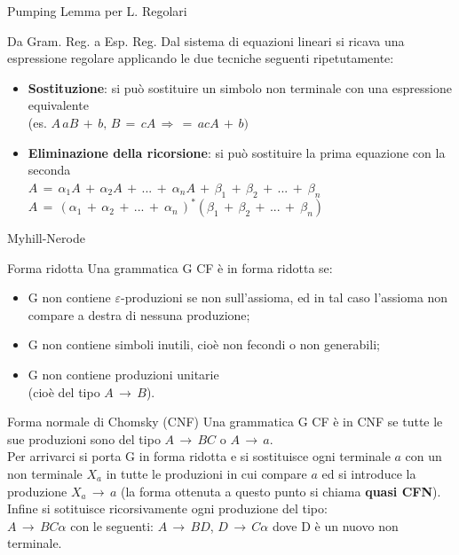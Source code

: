 \documentclass[10pt,a4paper]{article}
\begin{document}
\begin{multicols}{3}
\begin{textbox}{Pumping Lemma per L. Regolari}
\end{textbox}

\begin{textbox}{Da Gram. Reg. a Esp. Reg.}
Dal sistema di equazioni lineari si ricava una espressione regolare
applicando le due tecniche seguenti ripetutamente:
\begin{itemize}[leftmargin=*]
    \item \textbf{Sostituzione}: si può sostituire un simbolo non terminale con una espressione equivalente \\
    (es. \(A\, aB\, +\, b,\, B\, =\, cA\,\Rightarrow \,  =\, acA\, +\, b)\)
    \item \textbf{Eliminazione della ricorsione}: si può sostituire la prima equazione con la seconda\\
    \(A\,=\,\alpha_1A\,+\,\alpha_2A\,+\,...\,+\
    \alpha_nA\,+\,\beta_1\,+\,\beta_2\,+\,...\,+\
    \beta_n\) \\
    \(A\,=\,(\alpha_1\,+\,\alpha_2\,+\,...\,+\
    \alpha_n\,)^\ast(\beta_1\,+\,\beta_2\,+\,...\,+\
    \beta_n)\)
\end{itemize}

\end{textbox}


\begin{textbox}{Myhill-Nerode}
\lipsum[1]

\end{textbox}

\begin{textbox}{Forma ridotta}
Una grammatica G CF è in forma ridotta se:
\begin{itemize}[leftmargin=*]
    \item G non contiene \(\varepsilon\)-produzioni
    se non sull’assioma, ed in tal caso l’assioma non
    compare a destra di nessuna produzione;
    \item G non contiene simboli inutili, cioè non fecondi o non generabili;
    \item G non contiene produzioni unitarie\\(cioè del tipo \(A\,\rightarrow\,B\)).
\end{itemize}

\end{textbox}

\begin{textbox}{Forma normale di Chomsky (CNF)}
Una grammatica G CF è in CNF se tutte le sue produzioni sono del tipo \(A\,\rightarrow\,BC\) o \(A\,\rightarrow\,a\).\\
Per arrivarci si porta G in forma ridotta e si sostituisce ogni terminale \(a\) con un non terminale \(X_a\) in tutte le produzioni
in cui compare \(a\) ed si introduce la produzione \(X_a\,\rightarrow\,a\)
(la forma ottenuta a questo punto si chiama \textbf{quasi CFN}).\\
Infine si sotituisce ricorsivamente ogni produzione del tipo:\\
\(A\,\rightarrow\,BC\alpha\) con le seguenti:
\(A\,\rightarrow\,BD\), \(D\,\rightarrow\,C\alpha\) dove D è un nuovo non terminale.
\end{textbox}



\end{multicols}
\end{document}
